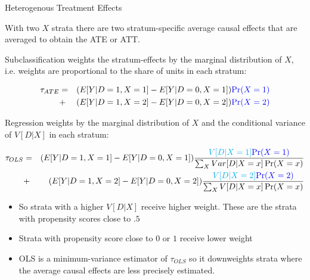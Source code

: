 \documentclass{beamer}
\numberwithin{equation}{section}
\begin{document}
\begin{frame}{Heterogenous Treatment Effects}

\scriptsize

With two $X$ strata there are two stratum-specific average causal
effects that are averaged to obtain the ATE or ATT.

Subclassification weights the stratum-effects by the marginal
distribution of $X$, i.e. weights are proportional to the share of units in each stratum:

\begin{eqnarray*}
\tau_{ATE} &=& (E[Y|D=1,X=1]-E[Y|D=0,X=1])\textcolor{blue}{\Pr(X=1)} \\
   &+&   (E[Y|D=1,X=2]-E[Y|D=0,X=2])\textcolor{blue}{\Pr(X=2)}
\end{eqnarray*}

Regression weights by the marginal distribution of $X$ \alert{and} the
conditional variance of $V[D|X]$ in each stratum:

\begin{eqnarray*}
  \tau_{OLS} &=& (E[Y|D=1,X=1]- E[Y|D=0,X=1])\frac{\textcolor{cyan}{V[D|X=1]}\textcolor{blue}{\Pr(X=1)}}{\sum_{X}Var[D|X=x]\Pr(X=x)} \\
   &+& (E[Y|D=1,X=2]- E[Y|D=0,X=2])\frac{\textcolor{cyan}{V[D|X=2]}\textcolor{blue}{\Pr(X=2)}}{\sum_{X}V[D|X=x]\Pr(X=x)}
\end{eqnarray*}

\begin{itemize}
\itemsep1pt\parskip0pt
\item
  So strata with a higher $V[D|X]$ receive higher weight. These are
  the strata with propensity scores close to $.5$
\item
  Strata with propensity score close to $0$ or $1$ receive lower weight
\item
  OLS is a minimum-variance estimator of $\tau_{OLS}$ so it
  downweights strata where the average causal effects are less precisely
  estimated.
\end{itemize}

\end{frame}
\end{document}
